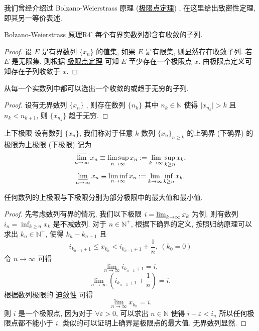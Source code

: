 \documentclass[cn,toc=twocol]{elegantbook}
\newcommand{\N}{\mathbb{N}}
\begin{document}
我们曾经介绍过 Bolzano-Weierstrass 原理 (\hyperref[thm:R4]{极限点定理}) , 在这里给出致密性定理, 即其另一等价表述.
\begin{theorem}{Bolzano-Weierstrass 原理}{R4'}
	每个有界实数列都含有收敛的子列.
\end{theorem}
\begin{proof}
	设 $E$ 是有界数列 $\{x_n\}$ 的值集, 如果 $E$ 是有限集, 则显然存在收敛子列. 若 $E$ 是无限集, 则根据 \hyperref[thm:R4]{极限点定理} 可知 $E$ 至少存在一个极限点 $x$. 由极限点定义可知存在子列收敛于 $x$.
\end{proof}

\begin{corollary}
	从每一个实数列中都可以选出一个收敛的或趋于无穷的子列.
\end{corollary}

\begin{proof}
	设有无界数列 $\{x_n\}$ , 则存在数列 $\{n_k\}$ 其中 $n_k \in \N$ 使得 $\lvert x_{n_k} \rvert > k$ 且 $n_k < n_{k+1}$, 则 $\{x_{n_k}\}$ 趋于无穷. 
\end{proof}


\begin{definition}{上下极限}
设有数列 $\{x_n\}$, 我们称对于任意 $k$ 数列 $\{x_n\}_{n \ge k}$ 的上确界 (下确界) 的极限为上极限 (下极限) 记为
\[
	\varlimsup_{n\to\infty} x_n \equiv \limsup_{n\to\infty} x_n := \lim_{k\to\infty} \sup_{k \ge n} x_k,
\]
\[
	\varliminf_{n\to\infty} x_n \equiv \liminf_{n\to\infty} x_n := \lim_{k\to\infty} \inf_{k \ge n} x_k.
\]
\end{definition}

\begin{proposition}
	任何数列的上极限与下极限分别为部分极限中的最大值和最小值.
\end{proposition}

\begin{proof}
	先考虑数列有界的情况, 我们以下极限 $i = \varliminf_{k\to\infty} x_k$ 为例, 则有数列 $i_n = \inf_{k \ge n} x_k$ 是不减数列. 对于 $n \in \N^+$, 根据下确界的定义, 按照归纳原理可以求出 $k_n \in \N^+$, 使得 $k_n - k_{n+1}$ 且
	\[
		i_{k_{n-1} + 1} \le x_{k_n} < i_{k_{n-1} + 1} + \frac{1}{n},\ (k_0 = 0)
	\]
	令 $n \to \infty$ 可得
	\[
		\lim_{n \to \infty} i_{k_{n-1} + 1} = i,
	\]
	\[
		\lim_{n \to \infty} \left(i_{k_{n-1} + 1} + \frac{1}{n}\right) = i,
	\]
	根据数列极限的 \hyperref[thm:Ssandwich]{迫敛性} 可得
	\[
		\lim_{n \to \infty} x_{k_n} = i.
	\]
	则 $i$ 是一个极限点, 因为对于 $\forall \varepsilon > 0$, 可以求出 $n \in \N$ 使得 $i - \varepsilon < i_n$ 所以任何极限点都不能小于 $i$. 类似的可以证明上确界是极限点的最大值.
	无界数列显然.
\end{proof}
\end{document}
